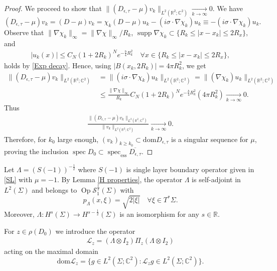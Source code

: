 \documentclass[11pt,a4paper,reqno,oneside]{amsproc}
\DeclareMathOperator{\dom}{dom}
\DeclareMathOperator{\spec}{spec}
\DeclareMathOperator{\supp}{supp}
\DeclareMathOperator{\Op}{Op}
\newcommand{\spece}{\spec_\mathrm{ess}}
\newcommand{\cS}{\mathcal{S}}
\def \rr {{\mathbb R}}
\def \cc {{\mathbb C}}
\numberwithin{equation}{section}
\def\dom{\mathrm{dom}}
\def \cc {{\mathbb{C}}}
\begin{document}
\begin{proof}
We proceed to show that $\| (D_{\epsilon,\tau}-\mu)v_k\|_{L^2(\rr^2;\cc^2)} \xrightarrow[k\to\infty]{} 0$. We have 
\[
(D_{\epsilon,\tau}-\mu)v_k= (D-\mu)v_k= \chi_k(D-\mu)u_k -(i\sigma\cdot\nabla \chi_k)u_k\equiv  -(i\sigma\cdot\nabla \chi_k)u_k.
\]
Observe that $\| \nabla\chi_k\|_{\infty}= \| \nabla\chi\|_{\infty}/ R_k$, $\supp\nabla\chi_k\subset \{ R_k\leq |x-x_k|\leq 2 R_x\}$, and 
\begin{align*}
|u_k(x)| \leq C_N(1+2R_k)^Ne^{-\frac{b}{4} R_k^2} \quad \forall x\in \{ R_k\leq |x-x_k|\leq 2 R_x\},
\end{align*}
holds by \eqref{Exp decay}. Hence, using $| B(x_k, 2R_k)|= 4\pi R_k^2$,  we get 
\begin{align*}
\| (D_{\epsilon,\tau}-\mu)v_k\|_{L^2(\rr^2;\cc^2)} &=   \|(i\sigma\cdot\nabla \chi_k)u_k\|_{L^2(\rr^2;\cc^2)}= \|(\nabla \chi_k)u_k\|_{L^2(\rr^2;\cc^2)}\\
&\leq \frac{\|\nabla\chi\|_{\infty}}{R_k} C_N(1+2R_k)^Ne^{-\frac{b}{4} R_k^2} (4\pi R_k^2) \xrightarrow[k\to\infty]{} 0.
\end{align*}
Thus
\begin{align*}
\frac{\| (D_{\epsilon,\tau}-\mu)v_k\|_{L^2(\rr^2;\cc^2)} }{\| v_k\|_{L^2(\rr^2;\cc^2)}}   \xrightarrow[k\to\infty]{} 0.
\end{align*}
Therefore, for $k_0$ large enough,  $(v_k)_{k\geq k_0}\subset \dom D_{\epsilon,\tau}$ is a singular sequence for $\mu$, proving the inclusion $\spec D_0\subset \spece \overline{D_{\epsilon,\tau}}$.
\end{proof}



Let $\Lambda= (S(-1))^{-\frac{1}{2}}$ where $S(-1)$ is single layer boundary operator given in \eqref{SL} with $\mu=-1$. By Lemma  \ref{H properties}, the operator $\Lambda$ is self-adjoint in $L^2(\Sigma)$ and belongs to  $\Op \cS^{\frac{1}{2}}_1(\Sigma)$ with
\[
p_\Lambda(x,\xi)=\sqrt{2|\xi|}\quad \forall \xi\in T^\ast\Sigma.
\]
Moreover,  $\Lambda: H ^{s}(\Sigma)\rightarrow H ^{s-\frac{1}{2}}(\Sigma)$ is an isomorphism for any $s\in\rr$.


For $z\in\rho(D_0)$ we introduce the operator 
\begin{align*}%
\mathcal L_z= (\Lambda \otimes I_2)\Pi_z ( \Lambda \otimes I_2)
\end{align*}
acting on the maximal domain 
\[
\dom \mathcal L_z= \{ g\in L^2(\Sigma;\cc^2): \mathcal L_z g\in L^2(\Sigma;\cc^2)\}.
\]
\end{document}
